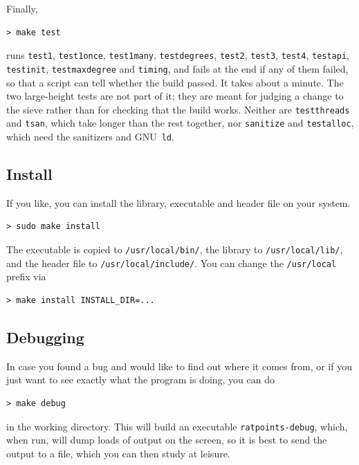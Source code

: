 \documentclass[12pt,a4paper,oneside]{amsart}
\begin{document}
Finally,
\begin{verbatim}
> make test
\end{verbatim}
\begin{sloppypar}
runs \texttt{test1}, \texttt{test1once}, \texttt{test1many},
\texttt{testdegrees}, \texttt{test2}, \texttt{test3}, \texttt{test4},
\texttt{testapi}, \texttt{testinit}, \texttt{testmaxdegree} and \texttt{timing},
and fails at the end if any of them failed, so that a script can
tell whether the build passed. It takes about a minute.
The two large-height tests are not part of it; they are meant for judging a
change to the sieve rather than for checking that the build works. Neither
are \texttt{testthreads} and \texttt{tsan}, which take longer than the rest
together, nor \texttt{sanitize} and \texttt{testalloc}, which need the
sanitizers and GNU~\texttt{ld}.
\end{sloppypar}

\subsection{Install}

If you like, you can install the library, executable and header file
on your system.

\begin{verbatim}
> sudo make install
\end{verbatim}

The executable is copied to \texttt{/usr/local/bin/}, the
library to \texttt{/usr/local/lib/}, and the header file to
\texttt{/usr/local/include/}. You can change the \texttt{/usr/local} prefix
via
\begin{verbatim}
> make install INSTALL_DIR=...
\end{verbatim}

\subsection{Debugging}

In case you found a bug and would like to find out where it comes from,
or if you just want to see exactly what the program is doing, you can
do

\begin{verbatim}
> make debug
\end{verbatim}

in the working directory. This will build an executable \texttt{ratpoints-debug},
which, when run, will dump loads of output on the screen, so it is best
to send the output to a file, which you can then study at leisure.
\end{document}
